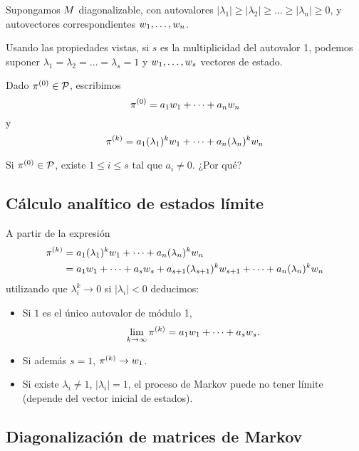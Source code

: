 Supongamos $\Mb$ diagonalizable, con autovalores $|\lambda_1| \ge |\lambda_2| \ge \dots \ge |\lambda_n| \ge 0$, y autovectores correspondientes $\wb_1, \dots, \wb_n$.

Usando las propiedades vistas, si $s$ es la multiplicidad del autovalor 1, podemos suponer $\lambda_1 = \lambda_2 = \dots = \lambda_s = 1$ y $\wb_1, \dots, \wb_s$ vectores de estado.

Dado $\pib^{(0)} \in \mathcal{P}$, escribimos
$$
\pib^{(0)} = a_1 \wb_1 + \dots + a_n \wb_n
$$
y
$$
\pib^{(k)} = a_1 (\lambda_1)^k \wb_1 + \dots + a_n (\lambda_n)^k \wb_n
$$

\begin{ejercicio} Si $\pib^{(0)} \in \mathcal{P}$, existe $1 \le i \le s$ tal que $a_i \neq 0$. ¿Por qué?
\end{ejercicio}

\subsection{Cálculo analítico de estados límite}

A partir de la expresión
$$
\begin{aligned}
\pib^{(k)} &= a_1 (\lambda_1)^k \wb_1 + \dots + a_n (\lambda_n)^k \wb_n \\
&= a_1 \wb_1 + \dots + a_s \wb_s + a_{s+1} (\lambda_{s+1})^k \wb_{s+1}+ \dots + a_n (\lambda_n)^k \wb_n
\end{aligned}
$$
utilizando que $\lambda_i^k \rightarrow 0$ si $|\lambda_i| < 0$ deducimos:

\begin{ejemplo}
\begin{itemize}
\item Si $1$ es el único autovalor de módulo 1,
$$
\lim_{k \rightarrow \infty} \pib^{(k)} = a_1 \wb_1 + \dots + a_s \wb_s.
$$
\item Si además $s = 1$, $\pib^{(k)} \rightarrow \wb_1$.
\item Si existe $\lambda_i \neq 1$, $|\lambda_i| = 1$, el proceso de Markov puede no tener límite (depende del vector inicial de estados).
\end{itemize}
\end{ejemplo}

\subsection{Diagonalización de matrices de Markov}

